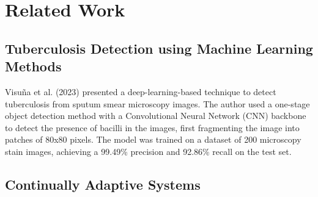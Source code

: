 \documentclass[../main.tex]{subfiles}
\begin{document}
       
    
    
	
    

    \section{Related Work} \label{related_work}

    \subsection{Tuberculosis Detection using Machine Learning Methods} \label{sec:ml_tuberculosis_detection}

    Visuña et al. (2023) \cite{visuna_novel_2023} presented a deep-learning-based technique to detect tuberculosis from sputum smear microscopy images. The author used a one-stage object detection method with a Convolutional Neural Network (CNN) backbone to detect the presence of bacilli in the images, first fragmenting the image into patches of 80x80 pixels. The model was trained on a dataset of 200 microscopy stain images, achieving a 99.49\% precision and 92.86\% recall on the test set. 
    
    \subsection{Continually Adaptive Systems} \label{sec:continually_adaptive_systems}

    
\end{document}
